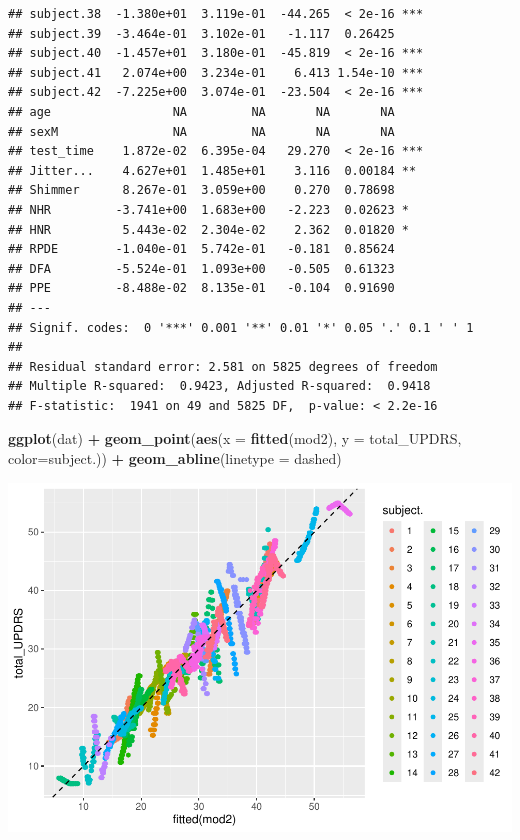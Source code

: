 \documentclass[
]{article}
\newenvironment{Shaded}{\begin{snugshade}}{\end{snugshade}}
\newcommand{\AttributeTok}[1]{\textcolor[rgb]{0.13,0.29,0.53}{#1}}
\newcommand{\FunctionTok}[1]{\textcolor[rgb]{0.13,0.29,0.53}{\textbf{#1}}}
\newcommand{\NormalTok}[1]{#1}
\newcommand{\SpecialCharTok}[1]{\textcolor[rgb]{0.81,0.36,0.00}{\textbf{#1}}}
\newcommand{\StringTok}[1]{\textcolor[rgb]{0.31,0.60,0.02}{#1}}
\begin{document}
\begin{verbatim}
## subject.38  -1.380e+01  3.119e-01  -44.265  < 2e-16 ***
## subject.39  -3.464e-01  3.102e-01   -1.117  0.26425    
## subject.40  -1.457e+01  3.180e-01  -45.819  < 2e-16 ***
## subject.41   2.074e+00  3.234e-01    6.413 1.54e-10 ***
## subject.42  -7.225e+00  3.074e-01  -23.504  < 2e-16 ***
## age                 NA         NA       NA       NA    
## sexM                NA         NA       NA       NA    
## test_time    1.872e-02  6.395e-04   29.270  < 2e-16 ***
## Jitter...    4.627e+01  1.485e+01    3.116  0.00184 ** 
## Shimmer      8.267e-01  3.059e+00    0.270  0.78698    
## NHR         -3.741e+00  1.683e+00   -2.223  0.02623 *  
## HNR          5.443e-02  2.304e-02    2.362  0.01820 *  
## RPDE        -1.040e-01  5.742e-01   -0.181  0.85624    
## DFA         -5.524e-01  1.093e+00   -0.505  0.61323    
## PPE         -8.488e-02  8.135e-01   -0.104  0.91690    
## ---
## Signif. codes:  0 '***' 0.001 '**' 0.01 '*' 0.05 '.' 0.1 ' ' 1
## 
## Residual standard error: 2.581 on 5825 degrees of freedom
## Multiple R-squared:  0.9423, Adjusted R-squared:  0.9418 
## F-statistic:  1941 on 49 and 5825 DF,  p-value: < 2.2e-16
\end{verbatim}

\begin{Shaded}
\begin{Highlighting}[]
\FunctionTok{ggplot}\NormalTok{(dat) }\SpecialCharTok{+} 
  \FunctionTok{geom\_point}\NormalTok{(}\FunctionTok{aes}\NormalTok{(}\AttributeTok{x =} \FunctionTok{fitted}\NormalTok{(mod2), }\AttributeTok{y =}\NormalTok{ total\_UPDRS, }\AttributeTok{color=}\NormalTok{subject.)) }\SpecialCharTok{+}
  \FunctionTok{geom\_abline}\NormalTok{(}\AttributeTok{linetype =} \StringTok{\textquotesingle{}dashed\textquotesingle{}}\NormalTok{) }
\end{Highlighting}
\end{Shaded}

\includegraphics{Regression_files/figure-latex/unnamed-chunk-10-1.pdf}
\end{document}
